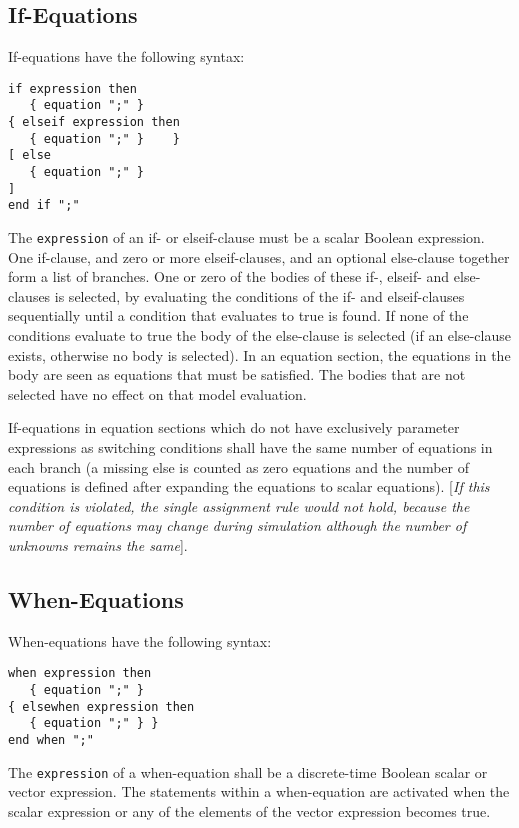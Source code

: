 \subsection{If-Equations}

If-equations have the following syntax:
\begin{lstlisting}[language=grammar]
if expression then
   { equation ";" }
{ elseif expression then
   { equation ";" }    }
[ else
   { equation ";" }
]
end if ";"
\end{lstlisting}

The \lstinline!expression! of an if- or elseif-clause must be a scalar Boolean
expression. One if-clause, and zero or more elseif-clauses, and an
optional else-clause together form a list of branches. One or zero of
the bodies of these if-, elseif- and else-clauses is selected, by
evaluating the conditions of the if- and elseif-clauses sequentially
until a condition that evaluates to true is found. If none of the
conditions evaluate to true the body of the else-clause is selected (if
an else-clause exists, otherwise no body is selected). In an equation
section, the equations in the body are seen as equations that must be
satisfied. The bodies that are not selected have no effect on that model
evaluation.

If-equations in equation sections which do not have exclusively
parameter expressions as switching conditions shall have the same number
of equations in each branch (a missing else is counted as zero equations
and the number of equations is defined after expanding the equations to
scalar equations). {[}\emph{If this condition is violated, the single
assignment rule would not hold, because the number of equations may
change during simulation although the number of unknowns remains the
same}{]}.

\subsection{When-Equations}

When-equations have the following syntax:
\begin{lstlisting}[language=grammar]
when expression then
   { equation ";" }
{ elsewhen expression then
   { equation ";" } }
end when ";"
\end{lstlisting}

The \lstinline!expression! of a when-equation shall be a discrete-time Boolean
scalar or vector expression. The statements within a when-equation are
activated when the scalar expression or any of the elements of the
vector expression becomes true.

